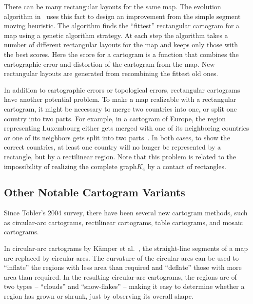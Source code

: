 \documentclass{egpubl}
\begin{document}
There can be many rectangular layouts for the same map. The evolution algorithm in~\cite{BSV12} uses this fact to design an improvement from the simple segment moving heuristic. The algorithm finds the ``fittest'' rectangular cartogram for a map using a genetic algorithm strategy. At each step the algorithm takes a number of different rectangular layouts for the map and keeps only those with the best scores. Here the score for a cartogram is a function that combines the cartographic error and distortion of the cartogram from the map. New rectangular layouts are generated from recombining the fittest old ones.


In addition to cartographic errors or topological errors, rectangular cartograms have another potential problem. To make a map realizable with a rectangular cartogram, it might be necessary to merge two countries into one, or split one country into two parts. For example, in a cartogram of Europe, the region representing Luxembourg either gets merged with one of its neighboring countries or one of its neighbors gets split into two parts~\cite{ks07}. In both cases, to show the correct countries, at least one country will no longer be represented by a rectangle, but by a rectilinear region. Note that this problem is related to the impossibility of realizing the complete graph$K_4$ by a contact of rectangles.

\subsection{Other Notable Cartogram Variants}



Since Tobler's 2004 survey, there have been several new cartogram methods, such as circular-arc cartograms, rectilinear cartograms, table cartograms, and mosaic cartograms. 

In circular-arc cartograms by K\"amper et al.~\cite{KKN13}, the straight-line segments of a map are replaced by circular arcs. The curvature of the circular arcs can be used to ``inflate'' the regions with less area than required and ``deflate'' those with more area than required. In the resulting circular-arc cartograms, the regions are of two types --  ``clouds'' and ``snow-flakes'' -- making it easy to determine whether a region has grown or shrunk, just by observing its overall shape. 
\end{document}

